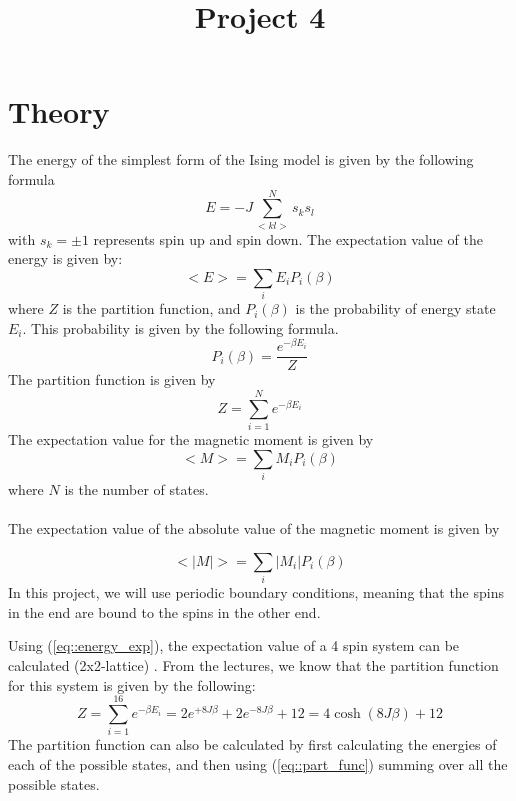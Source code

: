 \documentclass[12pt]{article}
\title{Project 4}
\begin{document}
\maketitle
\section{Theory}
The energy of the simplest form of the Ising model is given by the following formula
\begin{equation}\label{eq::energy}
E = -J\sum_{<kl>}^{N}s_ks_l
\end{equation}
with $s_k = \pm 1$ represents spin up and spin down. 
The expectation value of the energy is given by:
\begin{equation}\label{eq::energy_exp}
<E> = \sum_i E_i P_i(\beta)
\end{equation}
where $Z$ is the partition function, and $P_i(\beta)$ is the probability of energy state $E_i$. This probability is given by the following formula.
\begin{equation}\label{eq::prob}
P_i(\beta) = \frac{e^{-\beta E_i}}{Z}
\end{equation} 
The partition function is given by 
\begin{equation}\label{eq::part_func}
Z = \sum_{i=1}^{N} e^{-\beta E_i}
\end{equation}
The expectation value for the magnetic moment is given by 
\begin{equation}\label{eq::mag_mom_exp}
<M> = \sum_i M_i P_i(\beta)
\end{equation}
where $N$ is the number of states. 
\\
\\
The expectation value of the absolute value of the magnetic moment is given by 

\begin{equation}\label{eq::abs(mag_mom_exp)}
<|M|> = \sum_i |M_i| P_i(\beta)
\end{equation}
In this project, we will use periodic boundary conditions, meaning that the spins in the end are bound to the spins in the other end. 

Using (\ref{eq::energy_exp}), the expectation value of a 4 spin system can be calculated (2x2-lattice) . From the lectures, we know that the partition function for this system is given by the following:
\begin{equation}
Z = \sum_{i=1}^{16}e^{-\beta E_i} = 2e^{+8J\beta} + 2e^{-8J\beta} + 12 = 4\cosh(8J\beta) + 12
\end{equation}
The partition function can also be calculated by first calculating the energies of each of the possible states, and then using (\ref{eq::part_func}) summing over all the possible states. 
\end{document}
